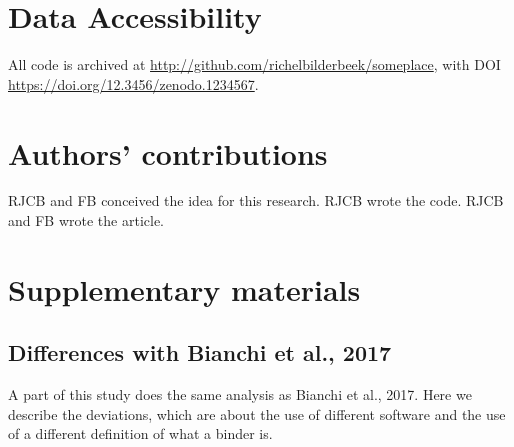 \section{Data Accessibility}

All code is archived at \url{http://github.com/richelbilderbeek/someplace},
with DOI \url{https://doi.org/12.3456/zenodo.1234567}.

\section{Authors' contributions}

RJCB and FB conceived the idea for this research. 
RJCB wrote the code.
RJCB and FB wrote the article.





\appendix
\section{Supplementary materials}

\subsection{Differences with Bianchi et al., 2017}

A part of this study does the same analysis as Bianchi et al., 2017.
Here we describe the deviations, which are about the use of different
software and the use of a different definition of what a binder is.


